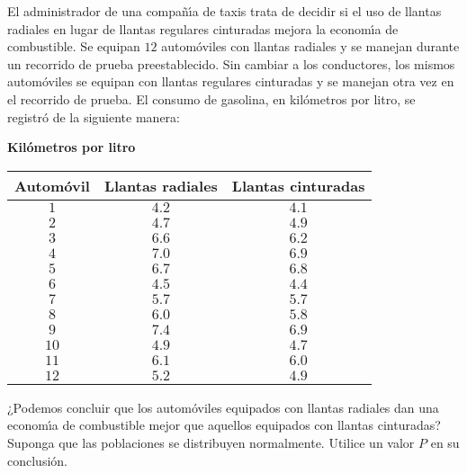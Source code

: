 \begin{enunciado}
 El administrador de una compa\~n\'{\i}a de taxis trata de decidir si el uso de llantas radiales en lugar de llantas regulares cinturadas mejora la econom\'{\i}a de combustible. Se equipan $12$ autom\'oviles con llantas radiales y se manejan durante un recorrido de prueba preestablecido. Sin cambiar a los conductores, los mismos autom\'oviles se equipan con llantas regulares cinturadas y se manejan otra vez en el recorrido de prueba. El consumo de gasolina, en kil\'ometros por litro, se registr\'o de la siguiente manera:
 \begin{center}
  \textbf{Kil\'ometros por litro} \\
  \begin{tabular}{ccc}
   \hline 
   \textbf{Autom\'ovil} & \textbf{Llantas radiales} & \textbf{Llantas cinturadas} \\
   \hline
   $1$  & $4.2$ & $4.1$ \\
   $2$  & $4.7$ & $4.9$ \\
   $3$  & $6.6$ & $6.2$ \\
   $4$  & $7.0$ & $6.9$ \\
   $5$  & $6.7$ & $6.8$ \\
   $6$  & $4.5$ & $4.4$ \\
   $7$  & $5.7$ & $5.7$ \\
   $8$  & $6.0$ & $5.8$ \\
   $9$  & $7.4$ & $6.9$ \\
   $10$ & $4.9$ & $4.7$ \\
   $11$ & $6.1$ & $6.0$ \\
   $12$ & $5.2$ & $4.9$
  \end{tabular}
 \end{center}
 ¿Podemos concluir que los autom\'oviles equipados con llantas radiales dan una econom\'{\i}a de combustible mejor que aquellos equipados con llantas cinturadas? Suponga que las poblaciones se distribuyen normalmente. Utilice un valor $P$ en su conclusi\'on.
\end{enunciado}

